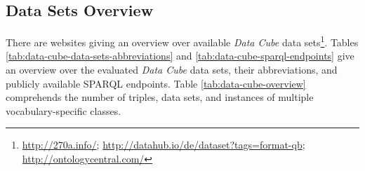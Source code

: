 \documentclass{llncs}
\begin{document}
\subsection{Data Sets Overview}

There are websites giving an overview over available \emph{Data Cube} data sets\footnote{\url{http://270a.info/}; \url{http://datahub.io/de/dataset?tags=format-qb}; \url{http://ontologycentral.com/}}. 
Tables \ref{tab:data-cube-data-sets-abbreviations} and \ref{tab:data-cube-sparql-endpoints} give an overview over the evaluated \emph{Data Cube} data sets, their abbreviations, and publicly available SPARQL endpoints.
Table \ref{tab:data-cube-overview} comprehends the number of triples, data sets, and instances of multiple vocabulary-specific classes.

\end{document}

